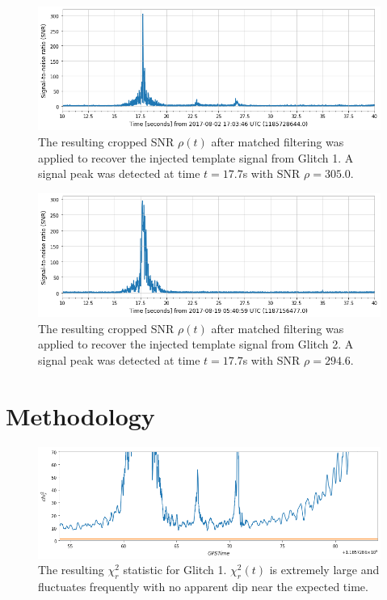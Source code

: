 \documentclass[preprint,
letterpaper,
 amsmath,amssymb,
 aps,
]{revtex4-2}
\begin{document}
\begin{figure}[t]
\includegraphics[width = .9\textwidth]{glitch loud 69 template 1.png}
\caption{The resulting cropped SNR $\rho(t)$ after matched filtering was applied to recover the injected template signal from Glitch 1. A signal peak was detected at time $t = 17.7$s with SNR $\rho = 305.0$.}
\centering
\end{figure}

\begin{figure}[t]
\includegraphics[width = .9\textwidth]{glitch loud 02 template 1.png}
\caption{The resulting cropped SNR $\rho(t)$ after matched filtering was applied to recover the injected template signal from Glitch 2. A signal peak was detected at time $t = 17.7$s with SNR $\rho = 294.6$.}
\centering
\end{figure}

\section{Methodology} \label{method}

\begin{figure}[t]
\includegraphics[width = .9\textwidth]{chi2 glitch 1 zoomed.png}
\caption{The resulting $\chi^2_r$ statistic for Glitch 1. $\chi_r^2(t)$ is extremely large and fluctuates frequently with no apparent dip near the expected time.}
\centering
\end{figure} 
\end{document}
